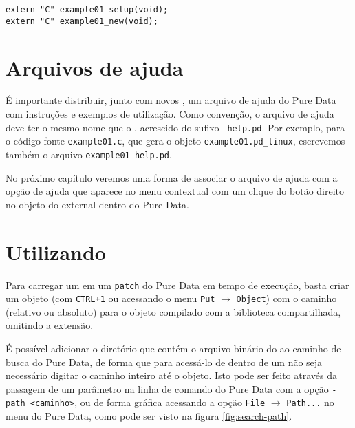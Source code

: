 \begin{lstlisting}[caption=Externalização de código C++]
extern "C" example01_setup(void);
extern "C" example01_new(void);
\end{lstlisting}


\section{Arquivos de ajuda}

É importante distribuir, junto com novos \externals, um arquivo de ajuda do
Pure Data com instruções e exemplos de utilização. Como convenção, o arquivo
de ajuda deve ter o mesmo nome que o \external, acrescido do sufixo
\texttt{-help.pd}. Por exemplo, para o código fonte \texttt{example01.c}, que
gera o objeto \texttt{example01.pd\_linux}, escrevemos também o arquivo
\texttt{example01-help.pd}.


No próximo capítulo veremos uma forma de associar o arquivo de ajuda com a
opção de ajuda que aparece no menu contextual com um clique do botão direito
no objeto do external dentro do Pure Data.

\section{Utilizando \externals}
\label{sec:using}

Para carregar um \external em um \texttt{patch} do Pure Data em tempo de
execução, basta criar um objeto (com \texttt{CTRL+1} ou acessando o menu
\texttt{Put} $\rightarrow$ \texttt{Object}) com o caminho (relativo ou
absoluto) para o objeto compilado com a biblioteca compartilhada, omitindo a
extensão.

É possível adicionar o diretório que contém o arquivo binário do \external ao
caminho de busca do Pure Data, de forma que para acessá-lo de dentro de um
\patch não seja necessário digitar o caminho inteiro até o objeto. Isto pode
ser feito através da passagem de um parâmetro na linha de comando do Pure Data
com a opção \texttt{-path <caminho>}, ou de forma gráfica acessando a opção
\texttt{File} $\rightarrow$ \texttt{Path...} no menu do Pure Data,
como pode ser visto na figura \ref{fig:search-path}.

